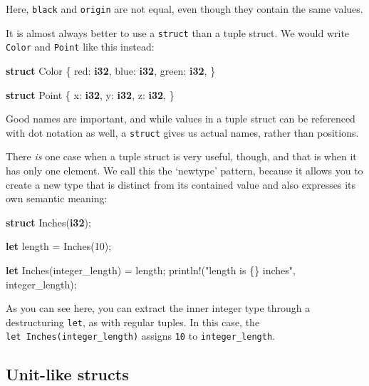 \documentclass[a4paper,]{book}
\newenvironment{Shaded}{\begin{snugshade}}{\end{snugshade}}
\newcommand{\KeywordTok}[1]{\textcolor[rgb]{0.13,0.29,0.53}{\textbf{{#1}}}}
\newcommand{\DecValTok}[1]{\textcolor[rgb]{0.00,0.00,0.81}{{#1}}}
\newcommand{\StringTok}[1]{\textcolor[rgb]{0.31,0.60,0.02}{{#1}}}
\newcommand{\OtherTok}[1]{\textcolor[rgb]{0.56,0.35,0.01}{{#1}}}
\newcommand{\NormalTok}[1]{{#1}}
\begin{document}
Here, \texttt{black} and \texttt{origin} are not equal, even though they
contain the same values.

It is almost always better to use a \texttt{struct} than a tuple struct.
We would write \texttt{Color} and \texttt{Point} like this instead:

\begin{Shaded}
\begin{Highlighting}[]
\KeywordTok{struct} \NormalTok{Color \{}
    \NormalTok{red: }\KeywordTok{i32}\NormalTok{,}
    \NormalTok{blue: }\KeywordTok{i32}\NormalTok{,}
    \NormalTok{green: }\KeywordTok{i32}\NormalTok{,}
\NormalTok{\}}

\KeywordTok{struct} \NormalTok{Point \{}
    \NormalTok{x: }\KeywordTok{i32}\NormalTok{,}
    \NormalTok{y: }\KeywordTok{i32}\NormalTok{,}
    \NormalTok{z: }\KeywordTok{i32}\NormalTok{,}
\NormalTok{\}}
\end{Highlighting}
\end{Shaded}

Good names are important, and while values in a tuple struct can be
referenced with dot notation as well, a \texttt{struct} gives us actual
names, rather than positions.

There \emph{is} one case when a tuple struct is very useful, though, and
that is when it has only one element. We call this the `newtype'
pattern, because it allows you to create a new type that is distinct
from its contained value and also expresses its own semantic meaning:

\begin{Shaded}
\begin{Highlighting}[]
\KeywordTok{struct} \NormalTok{Inches(}\KeywordTok{i32}\NormalTok{);}

\KeywordTok{let} \NormalTok{length = Inches(}\DecValTok{10}\NormalTok{);}

\KeywordTok{let} \NormalTok{Inches(integer_length) = length;}
\OtherTok{println!}\NormalTok{(}\StringTok{"length is \{\} inches"}\NormalTok{, integer_length);}
\end{Highlighting}
\end{Shaded}

As you can see here, you can extract the inner integer type through a
destructuring \texttt{let}, as with regular tuples. In this case, the
\texttt{let\ Inches(integer\_length)} assigns \texttt{10} to
\texttt{integer\_length}.

\subsection{Unit-like structs}\label{unit-like-structs}
\end{document}
